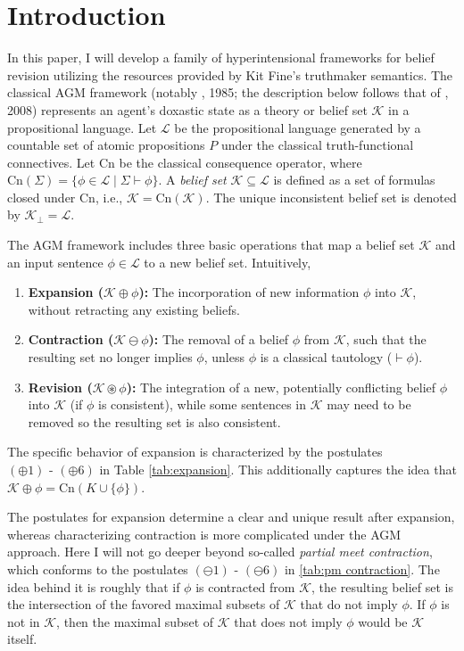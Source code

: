 \documentclass[12pt]{article}
\newcommand{\K}{\mathcal{K}}
\newcommand{\ostar}{\circledast}
\begin{document}
\section{Introduction}
In this paper, I will develop a family of hyperintensional frameworks for belief revision utilizing the resources provided by Kit Fine's truthmaker semantics. The classical AGM framework (notably \citeauthor{Alchourron1985-ALCOTL-2}, 1985; the description below follows that of \citeauthor{vanDitmarsch2007-VANDEL-6}, 2008) represents an agent's doxastic state as a theory or belief set $\K$ in a propositional language. Let $\mathcal{L}$ be the propositional language generated by a countable set of atomic propositions $P$ under the classical truth-functional connectives. Let $\text{Cn}$ be the classical consequence operator, where $\text{Cn}(\Sigma) = \{ \phi \in \mathcal{L} \mid \Sigma \vdash \phi \}$. A \emph{belief set} $\K \subseteq \mathcal{L}$ is defined as a set of formulas closed under $\text{Cn}$, i.e., $\K = \text{Cn}(\K)$. The unique inconsistent belief set is denoted by $\K_{\bot} = \mathcal{L}$.
\par
The AGM framework includes three basic operations that map a belief set $\K$ and an input sentence $\phi \in \mathcal{L}$ to a new belief set. Intuitively, 
\begin{enumerate}
    \item \textbf{Expansion ($\K \oplus \phi$):} The incorporation of new information $\phi$ into $\K$, without retracting any existing beliefs. 
    \item \textbf{Contraction ($\K \ominus \phi$):} The removal of a belief $\phi$ from $\K$, such that the resulting set no longer implies $\phi$, unless $\phi$ is a classical tautology ($\vdash \phi$).
    \item \textbf{Revision ($\K \ostar \phi$):} The integration of a new, potentially conflicting belief $\phi$ into $\K$ (if $\phi$ is consistent), while some sentences in $\K$ may need to be removed so the resulting set is also consistent.
\end{enumerate}
\par
The specific behavior of expansion is characterized by the postulates $(\oplus 1) \text{ - } (\oplus 6)$ in Table \ref{tab:expansion}. This additionally captures the idea that $\K \oplus \phi = \text{Cn}(K \cup \{\phi\})$. 
\par
The postulates for expansion determine a clear and unique result after expansion, whereas characterizing contraction is more complicated under the AGM approach. Here I will not go deeper beyond so-called \textit{partial meet contraction}, which conforms to the postulates $(\ominus 1) \text{ - } (\ominus 6)$ in \ref{tab:pm contraction}. The idea behind it is roughly that if $\phi$ is contracted from $\K$, the resulting belief set is the intersection of the favored maximal subsets of $\K$ that do not imply $\phi$. If $\phi$ is not in $\K$, then the maximal subset of $\K$ that does not imply $\phi$ would be $\K$ itself. 
\end{document}
